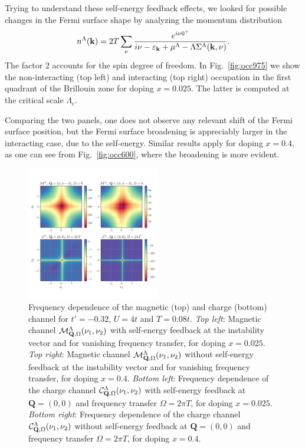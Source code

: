 Trying to understand these self-energy feedback effects, we looked for possible changes in the Fermi surface shape by analyzing the momentum distribution
%
\begin{equation}
 n^{\Lambda}(\mathbf{k})  = 2T \sum_{\nu}\frac{e^{i\nu 0^+}}{i\nu-\varepsilon_{\mathbf{k}}+\mu^\Lambda-\Lambda\Sigma^\Lambda(\mathbf{k},\nu)}.
 \label{eq:occ} 
\end{equation}
%
The factor $2$ accounts for the spin degree of freedom. 
In Fig.~\ref{fig:occ975} we show the non-interacting (top left) and interacting (top right) occupation in the first quadrant of the Brillouin zone for doping $x=0.025$.
The latter is computed at the critical scale $\Lambda_\mathrm{c}$. 

Comparing the two panels, one does not observe any relevant shift of the Fermi surface position, but the Fermi surface broadening is appreciably larger in the interacting case, due to the self-energy.
Similar results apply for doping $x=0.4$, as one can see from Fig.~\ref{fig:occ600}, where the broadening is more evident.  

\begin{figure}
\hspace*{-1.0cm}
\includegraphics[width=0.52\textwidth]{images/Phi_color_all.png}
\caption{Frequency dependence of the magnetic (top) and charge (bottom) channel for $t'=-0.32$, $U=4t$ and $T=0.08t$.
\emph{Top left}:
Magnetic channel $\mathcal{M}^\Lambda_{\mathbf{Q},\Omega}(\nu_1,\nu_2)$ with self-energy feedback at the instability vector and for vanishing frequency transfer, for doping $x=0.025$.
\emph{Top right}:
Magnetic channel $\mathcal{M}^\Lambda_{\mathbf{Q},\Omega}(\nu_1,\nu_2)$ without self-energy feedback at the instability vector and for vanishing frequency transfer, for doping $x=0.4$.
\emph{Bottom left}:
Frequency dependence of the charge channel $\mathcal{C}^\Lambda_{\mathbf{Q},\Omega}(\nu_1,\nu_2)$ with self-energy feedback at $\mathbf{Q}=(0,0)$ and frequency transfer $\Omega=2\pi T$, for doping $x=0.025$.
\emph{Bottom right}:
Frequency dependence of the charge channel $\mathcal{C}^\Lambda_{\mathbf{Q},\Omega}(\nu_1,\nu_2)$ without self-energy feedback at $\mathbf{Q}=(0,0)$ and frequency transfer $\Omega=2\pi T$, for doping $x=0.4$.
}  
\label{fig:freqplot} 
\end{figure}

